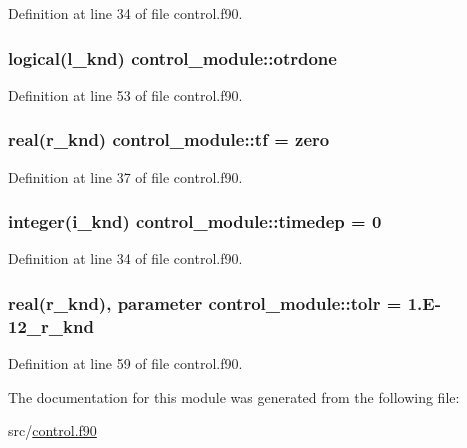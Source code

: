 Definition at line 34 of file control.\-f90.

\hypertarget{classcontrol__module_a2a2bc582701b890779931ca8180a79e4}{
\subsubsection[{otrdone}]{\setlength{\rightskip}{0pt plus 5cm}logical(l\-\_\-knd) control\-\_\-module\-::otrdone}}\label{classcontrol__module_a2a2bc582701b890779931ca8180a79e4}


Definition at line 53 of file control.\-f90.

\hypertarget{classcontrol__module_a144620f0322c0ca01d9034fedd8d1076}{
\subsubsection[{tf}]{\setlength{\rightskip}{0pt plus 5cm}real(r\-\_\-knd) control\-\_\-module\-::tf = zero}}\label{classcontrol__module_a144620f0322c0ca01d9034fedd8d1076}


Definition at line 37 of file control.\-f90.

\hypertarget{classcontrol__module_a19077c84dfe2f11b40e39a9a63178731}{
\subsubsection[{timedep}]{\setlength{\rightskip}{0pt plus 5cm}integer(i\-\_\-knd) control\-\_\-module\-::timedep = 0}}\label{classcontrol__module_a19077c84dfe2f11b40e39a9a63178731}


Definition at line 34 of file control.\-f90.

\hypertarget{classcontrol__module_ad7c6872b7fb56bee7e7870e4ffa9dc65}{
\subsubsection[{tolr}]{\setlength{\rightskip}{0pt plus 5cm}real(r\-\_\-knd), parameter control\-\_\-module\-::tolr = 1.\-E-\/12\-\_\-r\-\_\-knd}}\label{classcontrol__module_ad7c6872b7fb56bee7e7870e4ffa9dc65}


Definition at line 59 of file control.\-f90.



The documentation for this module was generated from the following file\-:\begin{DoxyCompactItemize}
\item 
src/\hyperlink{control_8f90}{control.\-f90}\end{DoxyCompactItemize}
